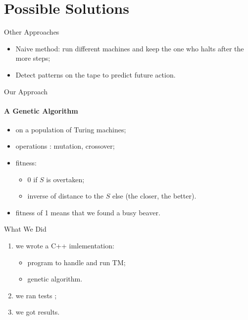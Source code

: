 \documentclass{beamer}
\begin{document}
\section{Possible Solutions}

\begin{frame}{Other Approaches}

  \begin{itemize}
  \item Naive method: run different machines and keep the one who halts after the more steps; %
  \item Detect patterns on the tape to predict future action.
  \end{itemize}

\end{frame}

\begin{frame}{Our Approach}
  \framesubtitle{A Genetic Algorithm}

  \begin{itemize}
  \item on a population of Turing machines;
  \item operations : mutation, crossover;
  \item fitness:
    \begin{itemize}
    \item 0 if $S$ is overtaken;
    \item inverse of distance to the $S$ else (the closer, the better).
    \end{itemize}
  \item fitness of 1 means that we found a busy beaver.
  \end{itemize}

\end{frame}

\begin{frame}{What We Did}

  \begin{enumerate}
  \item we wrote a C++ imlementation:
    \begin{itemize}
    \item program to handle and run TM;
    \item genetic algorithm.
    \end{itemize}
  \item we ran tests ;
  \item we got results.
  \end{enumerate}
\end{frame}
\end{document}
